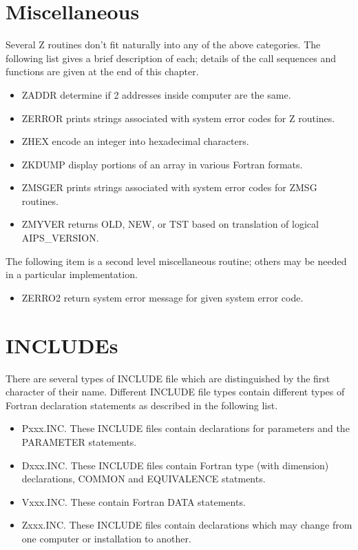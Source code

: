 \section{Miscellaneous }

Several Z routines don't fit naturally into any of the above
categories.  The following list gives a brief description of each;
details of the call sequences and functions are given at the end of
this chapter.
\begin{itemize} %
\item ZADDR   determine if 2 addresses inside computer
are the same.
\item ZERROR  prints strings associated with system
error codes for Z routines.
\item ZHEX    encode an integer into hexadecimal
characters.
\item ZKDUMP  display portions of an array in various
Fortran formats.
\item ZMSGER  prints strings associated with system
error codes for ZMSG routines.
\item ZMYVER  returns OLD, NEW, or TST based on
translation of logical AIPS\_VERSION.
\end{itemize} %


The following item is a second level miscellaneous routine;
others may be needed in a particular implementation.

\begin{itemize} %
\item ZERRO2  return system error message for given
system error code.
\end{itemize} %

\section{INCLUDEs}

There are several types of INCLUDE file which are distinguished by the
first character of their name.  Different INCLUDE file types contain
different types of Fortran declaration statements as described in the
following list.
\begin{itemize} %
\item Pxxx.INC.  These INCLUDE files contain declarations for parameters and
the PARAMETER statements.
\item Dxxx.INC.  These INCLUDE files contain Fortran type (with dimension)
declarations, COMMON and EQUIVALENCE statments.
\item Vxxx.INC.  These contain Fortran DATA statements.
\item Zxxx.INC.  These INCLUDE files contain declarations which may change
from one computer or installation to another.

\end{itemize} %
